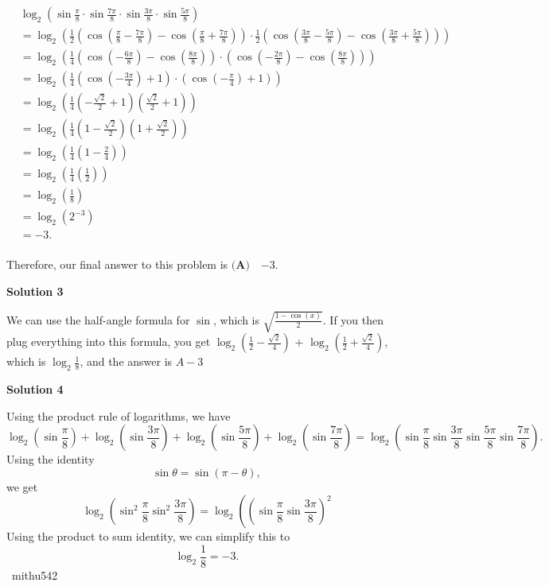 \begin{enumerate}
 \begin{align*}& \log_2 \left(\sin \frac{\pi}{8} \cdot \sin \frac{7 \pi}{8} \cdot \sin \frac{3 \pi}{8} \cdot \sin \frac{5 \pi}{8} \right) \\&= \log_2 \left(\frac{1}{2} \left(\cos \left(\frac{\pi}{8} - \frac{7 \pi}{8} \right) - \cos \left(\frac{\pi}{8} + \frac{7 \pi}{8} \right) \right) \cdot \frac{1}{2} \left(\cos \left(\frac{3 \pi}{8} - \frac{5 \pi}{8} \right) - \cos \left(\frac{3 \pi}{8} + \frac{5 \pi}{8} \right) \right) \right) \\&= \log_2 \left(\frac{1}{4} \left(\cos \left(- \frac{6 \pi}{8} \right) - \cos \left(\frac{8 \pi}{8} \right) \right) \cdot \left(\cos \left(- \frac{2 \pi}{8} \right) - \cos \left(\frac{8 \pi}{8} \right) \right) \right) \\&= \log_2 \left(\frac{1}{4} \left(\cos \left(- \frac{3 \pi}{4} \right) + 1 \right) \cdot \left(\cos \left(- \frac{\pi}{4} \right) + 1 \right) \right) \\&= \log_2 \left(\frac{1}{4} \left(- \frac{\sqrt{2}}{2} + 1 \right) \left(\frac{\sqrt{2}}{2} + 1 \right) \right) \\&= \log_2 \left(\frac{1}{4} \left(1 - \frac{\sqrt{2}}{2} \right) \left(1 + \frac{\sqrt{2}}{2} \right) \right) \\&= \log_2 \left(\frac{1}{4} \left(1 - \frac{2}{4} \right) \right) \\&= \log_2 \left(\frac{1}{4} \left(\frac{1}{2} \right) \right) \\&= \log_2 \left(\frac{1}{8} \right) \\&= \log_2 (2^{- 3}) \\&= - 3. \\\end{align*}


 Therefore, our final answer to this problem is $\textbf{(A)} \quad \boxed{- 3}.$




\textbf{Solution 3}

We can use the half-angle formula for $\sin$, which is $\sqrt{\frac{1-\cos(x)}{2}}$. If you then plug everything into this formula, you get $\log_2\left(\frac{1}{2}-\frac{\sqrt{2}}{4}\right)$ $+$ $\log_2\left(\frac{1}{2}+\frac{\sqrt{2}}{4}\right)$, which is $\log_2{\frac{1}{8}}$, and the answer is $\boxed {A -3}$




\textbf{Solution 4}

Using the product rule of logarithms, we have
 \[\log_2 \left(\sin \frac{\pi}{8}\right)+\log_2 \left(\sin \frac{3\pi}{8}\right)+\log_2 \left(\sin \frac{5\pi}{8}\right)+\log_2 \left(\sin \frac{7\pi}{8}\right)=\log_2 \left(\sin \frac{\pi}{8}\sin \frac{3\pi}{8}\sin \frac{5\pi}{8}\sin \frac{7\pi}{8}\right).\]Using the identity
 \[\sin \theta=\sin (\pi-\theta),\]we get
 \[\log_2 \left(\sin^2 \frac{\pi}{8}\sin^2\frac{3\pi}{8}\right)=\log_2\left(\left(\sin \frac{\pi}{8}\sin \frac{3\pi}{8}\right)^2\right.\]Using the product to sum identity, we can simplify this to
 \[\log_2 \frac{1}{8}=\boxed{-3}.\]~mithu542


\end{enumerate}
